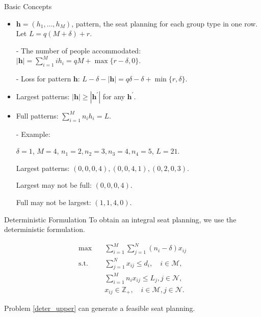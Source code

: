   \begin{frame}{Basic Concepts}
    \begin{itemize}
      \item $\bm{h} = (h_1, \ldots, h_M)$, pattern, the seat planning for each group type in one row.
      Let $L = q(M + \delta) + r$.

      - The number of people accommodated: $|\bm{h}| = \sum_{i =1}^{M} i h_i = qM + \max\{r-\delta, 0\}$.
      
      - Loss for pattern $\bm{h}$: $L- \delta - |\bm{h}| = q \delta - \delta + \min\{r, \delta\}$.
      \item Largest patterns: $|\bm{h}| \geq |\bm{h}^{\prime}|$ for any $\bm{h}^{\prime}$. 
      \item Full patterns: $\sum_{i=1}^{M} n_i h_i = L$.
      \item[-] {\color{blue} Example}: 
      
      $\delta = 1$, $M =4$, $n_1 = 2, n_2 = 3, n_3 = 4, n_4 = 5$, $L = 21$.
      
      Largest patterns: $(0, 0, 0, 4), (0, 0, 4, 1), (0, 2, 0, 3)$.

      Largest may not be full: $(0, 0, 0, 4)$.

      Full may not be largest: $(1, 1, 4, 0)$.
    \end{itemize}
  \end{frame}

  \begin{frame}{Deterministic Formulation}  %
    To obtain an integral seat planning, we use the deterministic formulation.
    
    \begin{equation}\label{deter_upper}
      \begin{aligned}
      \max \quad & \sum_{i=1}^{M}  \sum_{j= 1}^{N} (n_i- \delta) x_{ij} \\
      \text {s.t.} \quad & \sum_{j= 1}^{N} x_{ij} \leq d_{i}, \quad i \in \mathcal{M}, \\
      & \sum_{i=1}^{M} n_{i} x_{ij} \leq L_j, j \in \mathcal{N}, \\
      & x_{ij} \in \mathbb{Z}_{+}, \quad i \in \mathcal{M}, j \in \mathcal{N}.
      \end{aligned}
    \end{equation}
  
    Problem \eqref{deter_upper} can generate a feasible seat planning.
    
  \end{frame}

